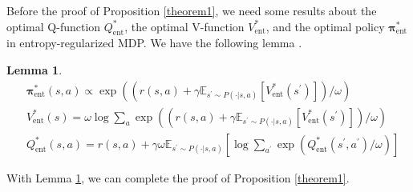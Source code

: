 \documentclass{article}
\newtheorem{lemma}{Lemma}
\begin{document}
	Before the proof of Proposition \ref{theorem1}, we need some results about the optimal Q-function $Q^*_{\operatorname{ent}}$, the optimal V-function $V^*_{\operatorname{ent}}$, and the optimal policy ${\bm{\pi}}^*_{\operatorname{ent}}$ in entropy-regularized MDP. We have the following lemma \citep{SAC-theory}.
	\begin{lemma}\label{ent-lemma}
		\begin{align*}
			& {\bm{\pi}}^*_{\operatorname{ent}}(s,a) \propto \exp\left( \left(r(s,a) + \gamma \mathbb{E}_{s^\prime \sim P(\cdot | s, a)}\left[ V^*_{\operatorname{ent}}(s^\prime) \right]  \right) / \omega  \right) \\
			& V^*_{\operatorname{ent}}(s) = \omega \log \sum_a \exp\left( \left(r(s,a) + \gamma \mathbb{E}_{s^\prime \sim P(\cdot | s, a)}\left[ V^*_{\operatorname{ent}}(s^\prime) \right]  \right) / \omega \right) \\
			& Q^*_{\operatorname{ent}}(s,a) = r(s,a) + \gamma \omega \mathbb{E}_{s^\prime \sim P(\cdot | s, a)}\left[ \log \sum_{a^\prime} \exp\left( Q^*_{\operatorname{ent}}(s^\prime,a^\prime) / \omega \right)  \right] 
		\end{align*}
	\end{lemma}
	With Lemma \ref{ent-lemma}, we can complete the proof of Proposition \ref{theorem1}.
	
\end{document}
